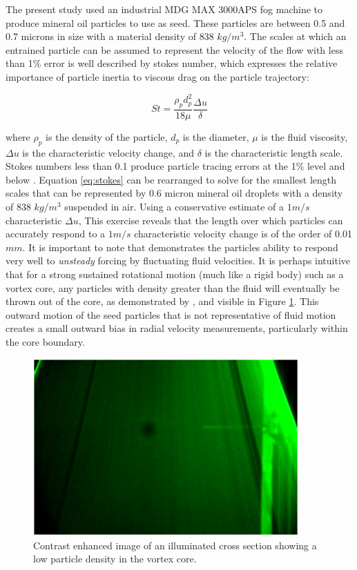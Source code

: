The present study used an industrial MDG MAX 
3000APS fog machine to produce mineral oil particles to use as seed. These 
particles are between 0.5 and 0.7 microns in size with a material density of 
838 $kg/m^3$. The scales at which an entrained particle can 
be assumed to represent the velocity of the flow with less than 1\% error is 
well described by stokes number, which expresses the relative importance of 
particle inertia to viscous drag on the particle trajectory:

\begin{equation}
St = \frac{\rho_p d^{2}_{p}}{18 \mu} \frac{\Delta u}{\delta}
	\label{eq:stokes}
\end{equation}

\noindent
where $\rho_p$ is the density of the particle, $d_p$ is the diameter, $\mu$ is 
the fluid viscosity, $\Delta u$ is the characteristic velocity change, and 
$\delta$ is the characteristic length scale. Stokes numbers less than 0.1 
produce particle tracing errors at the 1\% level and below \cite{brennen2005}.
Equation \ref{eq:stokes} can be rearranged to solve for the smallest length 
scales that can be represented by 0.6 micron mineral oil droplets with a 
density of 838 $kg/m^3$ suspended in air. Using a conservative estimate of a $1 
m/s$ characteristic $\Delta u$, This exercise reveals that the length over 
which particles can accurately respond to a $1 m/s$ characteristic velocity 
change is of the order of 0.01 $mm$. It is important to note that demonstrates 
the particles ability to respond very well to \textit{unsteady} forcing by 
fluctuating fluid velocities. It is perhaps intuitive that for a strong 
sustained rotational motion (much like a rigid body) such as a vortex core, any 
particles with density 
greater than the fluid will eventually be thrown out of the core, as 
demonstrated by \cite{lang1999}, and visible in Figure 
\ref{fig:vortex_core_particles}. This outward motion of the seed particles that 
is not representative of fluid motion creates a small outward bias in radial 
velocity measurements, particularly within the core boundary.

\begin{figure}[H]
	\centering
	\includegraphics[width=4in]{figs/piv_method/vortex_core}
	\caption{Contrast enhanced image of an illuminated cross section showing a 
		low particle density in the vortex core.}
	\label{fig:vortex_core_particles}
\end{figure}

